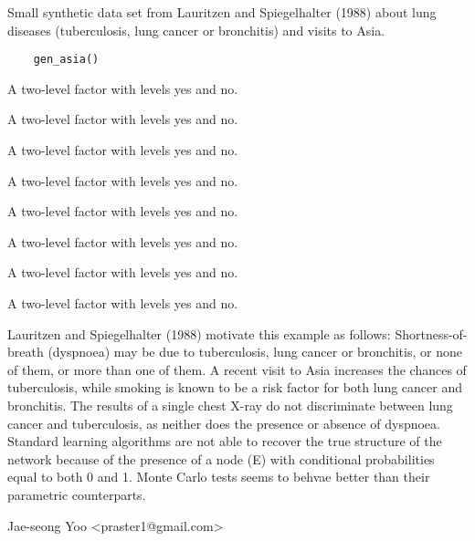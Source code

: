 \documentclass[a4paper]{book}
\begin{document}
%
\begin{Description}\relax
Small synthetic data set from Lauritzen and Spiegelhalter (1988) about lung diseases (tuberculosis, lung cancer or bronchitis) and visits to Asia.
\end{Description}
%
\begin{Usage}
\begin{verbatim}
	gen_asia()
\end{verbatim}
\end{Usage}
%
\begin{Value}
\begin{ldescription}
\item[\code{D (dyspnoea)}] A two-level factor with levels yes and no.
\item[\code{T (tuberculosis)}] A two-level factor with levels yes and no.
\item[\code{L (lung cancer)}] A two-level factor with levels yes and no.
\item[\code{B (bronchitis)}] A two-level factor with levels yes and no.
\item[\code{A (visit to Asia)}] A two-level factor with levels yes and no.
\item[\code{S (smoking)}] A two-level factor with levels yes and no.
\item[\code{X (chest X-ray)}] A two-level factor with levels yes and no.
\item[\code{E (tuberculosis versus lung cancer/bronchitis)}] A two-level factor with levels yes and no.
\end{ldescription}
\end{Value}
%
\begin{Note}\relax
Lauritzen and Spiegelhalter (1988) motivate this example as follows:
Shortness-of-breath (dyspnoea) may be due to tuberculosis, lung cancer or bronchitis, or none of them, or more than one of them. A recent visit to Asia increases the chances of tuberculosis, while smoking is known to be a risk factor for both lung cancer and bronchitis. The results of a single chest X-ray do not discriminate between lung cancer and tuberculosis, as neither does the presence or absence of dyspnoea.
Standard learning algorithms are not able to recover the true structure of the network because of the presence of a node (E) with conditional probabilities equal to both 0 and 1. Monte Carlo tests seems to behvae better than their parametric counterparts.
\end{Note}
%
\begin{Author}\relax
 Jae-seong Yoo <praster1@gmail.com> 
\end{Author}
\end{document}
